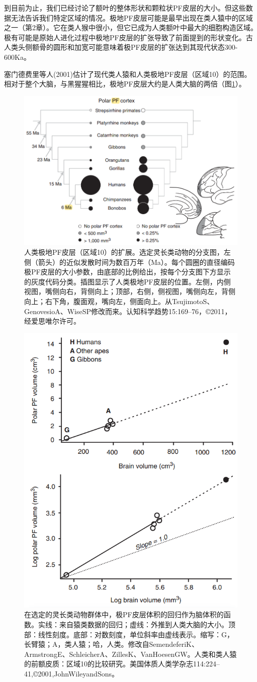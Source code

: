 \par
到目前为止，我们已经讨论了额叶的整体形状和颗粒状PF皮层的大小。但这些数据无法告诉我们特定区域的情况。极地PF皮层可能是最早出现在类人猿中的区域之一（第2章）。它在类人猴中很小，但它已成为人类额叶中最大的细胞构造区域。极有可能是原始人进化过程中极地PF皮层的扩张导致了前面提到的形状变化。古人类头侧额骨的圆形和加宽可能意味着极PF皮层的扩张达到其现代状态300-600Ka。
\par
塞门德费里等人(2001)估计了现代类人猿和人类极地PF皮层（区域10）的范围。相对于整个大脑，与黑猩猩相比，极地PF皮层大约是人类大脑的两倍（图\ref{fig:fig_9_1}）。
\par
\begin{figure}[!htb]
	\centering
	\includegraphics[width=0.5\linewidth]{image_pfc/Fig_9_1}
	\caption{人类极地PF皮层（区域10）的扩展。选定灵长类动物的分支图，左侧（箭头）的近似发散时间为数百万年（Ma）。每个圆圈的直径编码极PF皮层的大小参数，由底部的比例给出，按每个分支图下方显示的灰度代码分类。插图显示了人类极地PF皮层的位置。左侧，内侧视图，嘴侧向右，背侧向上；顶部，右侧，侧视图，嘴侧向左，背侧向上；右下角，腹面观，嘴向左，侧面向上。从TsujimotoS、GenovesioA、WiseSP修改而来。认知科学趋势15:169–76，©2011，经爱思唯尔许可。\label{fig:fig_9_1}}
\end{figure}

\par
\begin{figure}[!htb]
	\centering
	\includegraphics[width=0.5\linewidth]{image_pfc/Fig_9_2}
	\caption{在选定的灵长类动物群体中，极PF皮层体积的回归作为脑体积的函数。实线：来自猿类数据的回归；虚线：外推到人类大脑的大小。顶部：线性刻度。底部：对数刻度，单位斜率由虚线表示。缩写：G，长臂猿；A，类人猿；哈，人类。修改自SemendeferiK、ArmstrongE、SchleicherA、ZillesK、VanHoesenGW。人类和类人猿的前额皮质：区域10的比较研究。美国体质人类学杂志114:224–41,©2001,JohnWileyandSons。\label{fig:fig_9_2}}
\end{figure}

